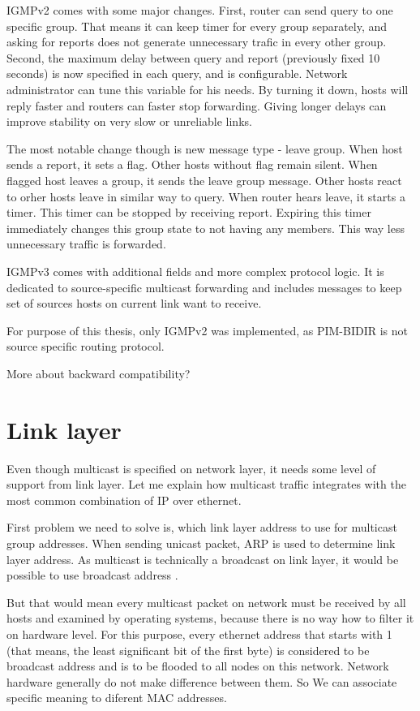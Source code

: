 IGMPv2 \cite{rfc2236} comes with some major changes. First, router can send
query to one specific group. That means it can keep timer for every group
separately, and asking for reports does not generate unnecessary trafic in
every other group. Second, the maximum delay between query and report
(previously fixed 10 seconds) is now specified in each query, and is
configurable. Network administrator can tune this variable for his needs. By
turning it down, hosts will reply faster and routers can faster stop
forwarding. Giving longer delays can improve stability on very slow or
unreliable links.

The most notable change though is new message type - leave group. When host
sends a report, it sets a flag. Other hosts without flag remain silent. When
flagged host leaves a group, it sends the leave group message. Other hosts
react to orher hosts leave in similar way to query. When router hears leave,
it starts a timer. This timer can be stopped by receiving report. Expiring this
timer immediately changes this group state to not having any members. This way
less unnecessary traffic is forwarded.

IGMPv3 comes with additional fields and more complex protocol logic. It is
dedicated to source-specific multicast forwarding and includes messages to keep
set of sources hosts on current link want to receive.

For purpose of this thesis, only IGMPv2 was implemented, as PIM-BIDIR is not
source specific routing protocol.

\TODO More about backward compatibility?

\section{Link layer}

Even though multicast is specified on network layer, it needs some level of
support from link layer. Let me explain how multicast traffic integrates with
the most common combination of IP over ethernet.

First problem we need to solve is, which link layer address to use for
multicast group addresses. When sending unicast packet, ARP is used to
determine link layer address. As multicast is technically a broadcast on link
layer, it would be possible to use broadcast address .

But that would mean every multicast packet on network must be received by all
hosts and examined by operating systems, because there is no way how to filter
it on hardware level. For this purpose, every ethernet address that starts with
1 (that means, the least significant bit of the first byte) is considered to be
broadcast address and is to be flooded to all nodes on this network. Network
hardware generally do not make difference between them. So We can associate
specific meaning to diferent MAC addresses.

